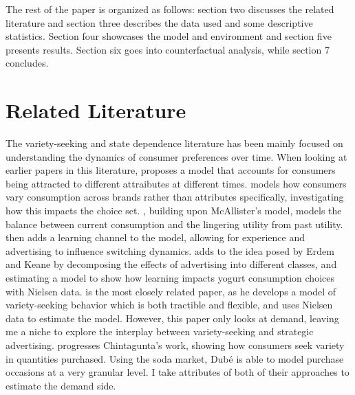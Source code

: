 \documentclass[11pt]{article}
\theoremstyle{definition}
\theoremstyle{remark}
\begin{document}
The rest of the paper is organized as follows: section two discusses the related
literature and section three describes the data used and some descriptive
statistics. Section four showcases the model and environment and section five
presents results. Section six goes into counterfactual analysis, while section 7
concludes.

\section{Related Literature}


The variety-seeking and state dependence literature has been mainly focused on understanding the dynamics of consumer preferences over time. When looking at earlier papers in this literature, \citet{mcalister_dynamic_2026} proposes a model that accounts for consumers being attracted to different attraibutes at different times. \cite{givon_variety_1984} models how consumers vary consumption across brands rather than attributes specifically, investigating how this impacts the choice set. \cite{lattin_model_1987}, building upon McAllister's model, models the balance between current consumption and the lingering utility from past utility. \cite{erdem_decision-making_1996} then adds a learning channel to the model, allowing for experience and advertising to influence switching dynamics. \cite{ackerberg_advertising_2003} adds to the idea posed by Erdem and Keane by decomposing the effects of advertising into different classes, and estimating a model to show how learning impacts yogurt consumption choices with Nielsen data. \cite{chintagunta_variety_1999} is the most closely related paper, as he develops a model of variety-seeking behavior which is both tractible and flexible, and uses Nielsen data to estimate the model. However, this paper only looks at demand, leaving me a niche to explore the interplay between variety-seeking and strategic advertising. \cite{dube_multiple_2004} progresses Chintagunta's work, showing how consumers seek variety in quantities purchased. Using the soda market, Dub\'{e} is able to model purchase occasions at a very granular level. I take attributes of both of their approaches to estimate the demand side.

\end{document}
